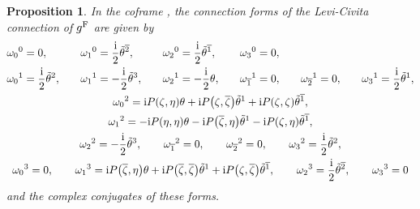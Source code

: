 \documentclass[pdftex]{sigma}
\newcommand\ol{\overline}
\numberwithin{equation}{section}
\newtheorem{Proposition}[Theorem]{Proposition}
 { \theoremstyle{definition}
\newtheorem{Definition}[Theorem]{Definition}
\newtheorem*{Notation}{Notation}
\newtheorem{Example}[Theorem]{Example}
\newtheorem{Remark}[Theorem]{Remark} }
\begin{document}
\begin{Proposition}\label{connection}
In the coframe \smash{$\bigl(\tilde\theta^0=\theta, \tilde\theta^1, \tilde\theta^{2}, \tilde\theta^{\ol1}, \tilde\theta^{\ol2}, \tilde\theta^3\bigr)$}, the connection forms of the Levi-Civita connection of $g^{\rm F}$ are given by
\begin{gather*}
\begin{alignedat}{7}
&\omega_0{}^0=0,\qquad&& \omega_1{}^0=\frac{{\rm i}}{2}\tilde\theta^{\ol2},\qquad&& \omega_2{}^0=\frac{{\rm i}}{2}\tilde\theta^{\ol1},\qquad&& \omega_3{}^0=0,& \\
&\omega_0{}^1=\frac{{\rm i}}{2}\tilde\theta^2,\qquad&& \omega_1{}^1=-\frac{{\rm i}}{2}\tilde\theta^3,\qquad&& \omega_2{}^1=-\frac{{\rm i}}{2}\theta,\qquad&& \omega_{\ol1}{}^1=0,\qquad && \omega_{\ol2}{}^1=0,\qquad&& \omega_3{}^1=\frac{{\rm i}}{2}\tilde\theta^1,&
\end{alignedat}
\\
\omega_0{}^2={\rm i}P(\zeta, \eta)\theta+{\rm i}P\bigl(\zeta, \ol\zeta\bigr)\tilde\theta^1+{\rm i}P(\zeta, \zeta)\tilde\theta^{\ol1},\\
\omega_1{}^2=-{\rm i}P(\eta, \eta)\theta-{\rm i}P\bigl(\ol\zeta, \eta\bigr)\tilde\theta^1-{\rm i}P(\zeta, \eta)\tilde\theta^{\ol1}, \\
\omega_2{}^2=-\frac{{\rm i}}{2}\tilde\theta^3, \qquad
\omega_{\ol1}{}^2=0, \qquad \omega_{\ol2}{}^2=0, \qquad \omega_3{}^2=\frac{{\rm i}}{2}\tilde\theta^2, \\
\omega_0{}^3=0, \qquad \omega_1{}^3={\rm i}P\bigl(\ol\zeta, \eta\bigr)\theta+{\rm i}P\bigl(\ol\zeta, \ol\zeta\bigr)\tilde\theta^1+{\rm i}P\bigl(\zeta, \ol\zeta\bigr)\tilde\theta^{\ol1}, \qquad \omega_2{}^3=\frac{{\rm i}}{2}\tilde\theta^{\ol2}, \qquad
\omega_3{}^3=0
\end{gather*}
and the complex conjugates of these forms.
\end{Proposition}
\end{document}
